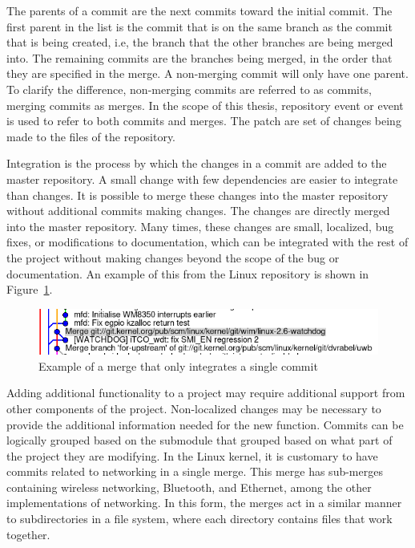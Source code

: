 The parents of a commit are the next commits toward the initial commit.
The first parent in the list is the commit that is on the same branch
as the commit that is being created, i.e, the branch that the other
branches are being merged into.
The remaining commits are the branches being merged, in the order that
they are specified in the merge.
A non-merging commit will only have one parent.
To clarify the difference, non-merging commits are referred to as
commits, merging commits as merges.
In the scope of this thesis, repository event or event is used to refer
to both commits and merges.
The patch are set of changes being made to the files of the repository.

Integration is the process by which the changes in a commit are added to
the master repository.
A small change with few dependencies are easier to integrate than
changes.
It is possible to merge these changes into the master repository
without additional commits making changes.
The changes are directly merged into the master repository.
Many times, these changes are small, localized, bug fixes, or modifications to
documentation, which can be integrated with the rest of the project
without making changes beyond the scope of the bug or documentation.
An example of this from the Linux repository is shown in
Figure~\ref{fig:single_commit_merge}.

\begin{figure}[htpb]
  \centering
  \includegraphics[width=0.8\linewidth]{Figures/background/single_commit.png}
  \caption{Example of a merge that only integrates a single commit}
  \label{fig:single_commit_merge}
\end{figure}


Adding additional functionality to a project may require additional
support from other components of the project.
Non-localized changes may be necessary to provide the additional
information needed for the new function.
Commits can be logically grouped based on the submodule that grouped
based on what part of the project they are modifying.
In the Linux kernel, it is customary to have commits related to
networking in a single merge.
This merge has sub-merges containing wireless networking, Bluetooth,
and Ethernet, among the other implementations of networking.
In this form, the merges act in a similar manner to subdirectories in a
file system, where each directory contains files that work together.

